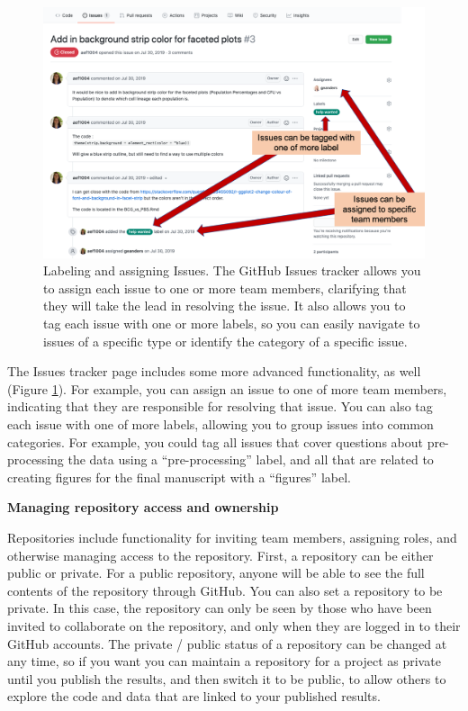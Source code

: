 \documentclass[]{tufte-book}
\begin{document}
\begin{figure}
\includegraphics[width=\textwidth]{figures/github_issues3} \caption[Labeling and assigning Issues]{Labeling and assigning Issues. The GitHub Issues tracker allows you to assign each issue to one or more team members, clarifying that they will take the lead in resolving the issue. It also allows you to tag each issue with one or more labels, so you can easily navigate to issues of a specific type or identify the category of a specific issue.}\label{fig:githubissues3}
\end{figure}

The Issues tracker page includes some more advanced functionality, as well
(Figure \ref{fig:githubissues3}). For example, you can assign an issue to one
of more team members, indicating that they are responsible for resolving that
issue. You can also tag each issue with one of more labels, allowing you to
group issues into common categories. For example, you could tag all issues that
cover questions about pre-processing the data using a ``pre-processing'' label,
and all that are related to creating figures for the final manuscript with a
``figures'' label.

\textbf{Managing repository access and ownership}

Repositories include functionality for inviting team members, assigning
roles, and otherwise managing access to the repository. First, a repository
can be either public or private. For a public repository, anyone will be
able to see the full contents of the repository through GitHub. You can
also set a repository to be private. In this case, the repository can only
be seen by those who have been invited to collaborate on the repository, and
only when they are logged in to their GitHub accounts. The private / public
status of a repository can be changed at any time, so if you want you can
maintain a repository for a project as private until you publish the results,
and then switch it to be public, to allow others to explore the code and data
that are linked to your published results.
\end{document}
